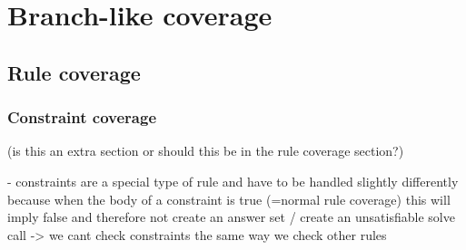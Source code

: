 \section{Branch-like coverage}
\label{sec:Coverage metrics/Branch-like coverage}

\subsection{Rule coverage}
\label{subsec:Coverage metrics/Branch-like coverage/Rule coverage}

\subsubsection{Constraint coverage}
\label{subsubsec:Coverage metrics/Branch-like coverage/Rule coverage/Constraint coverage}
(is this an extra section or should this be in the rule coverage section?)

- constraints are a special type of rule and have to be handled slightly differently because when the body of a constraint is true 
(=normal rule coverage) this will imply false and therefore not create an answer set / create an unsatisfiable solve call -> we 
cant check constraints the same way we check other rules

